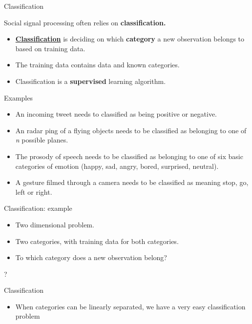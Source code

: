 \documentclass[compress]{beamer}
\begin{document}
\begin{frame}{Classification}

Social signal processing often relies on \textbf{classification.}

\begin{itemize}

\item
  \href{https://en.wikipedia.org/wiki/Statistical_classification}{\textbf{Classification}}
  is deciding on which \textbf{category} a new observation belongs to
  based on training data.
\item
  The training data contains data and known categories.
\item
  Classification is a \textbf{supervised} learning algorithm.
\end{itemize}

Examples

\begin{itemize}

\item
  An incoming tweet needs to classified as being positive or negative.
\item
  An radar ping of a flying objects needs to be classified as belonging
  to one of \emph{n} possible planes.
\item
  The prosody of speech needs to be classified as belonging to one of
  six basic categories of emotion (happy, sad, angry, bored, surprised,
  neutral).
\item
  A gesture filmed through a camera needs to be classified as meaning
  stop, go, left or right.
\end{itemize}

\end{frame}

\begin{frame}{Classification: example}

\begin{itemize}

\item
  Two dimensional problem.
\item
  Two categories, with training data for both categories.
\item
  To which category does a new observation belong?
\end{itemize}

?

\end{frame}

\begin{frame}{Classification}

\begin{itemize}

\item
  When categories can be linearly separated, we have a very easy
  classification problem
\end{itemize}

\end{frame}
\end{document}
